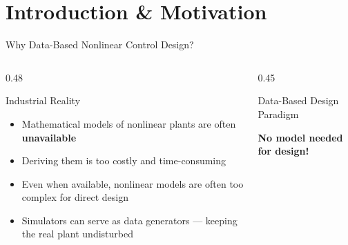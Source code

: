 \documentclass[hyperref={pdfpagemode=FullScreen},aspectratio=169]{beamer}
\newcommand{\highlight}[1]{{\color{accentgreen!70!black}\textbf{#1}}}
\newcommand{\alerttext}[1]{{\color{alertred}\textbf{#1}}}
\begin{document}
\section{Introduction \& Motivation}

\begin{frame}{Why Data-Based Nonlinear Control Design?}
  \begin{columns}[T]
    \begin{column}{0.48\textwidth}
      \begin{alertblock}{Industrial Reality}
        \begin{itemize}
          \item Mathematical models of nonlinear plants are often \alerttext{unavailable}
          \item Deriving them is too costly and time-consuming
          \item Even when available, nonlinear models are often too complex for direct design
          \item Simulators can serve as data generators --- keeping the real plant undisturbed
        \end{itemize}
      \end{alertblock}
    \end{column}
    \begin{column}{0.45\textwidth}
      \begin{block}{Data-Based Design Paradigm}
        \centering
      \end{block}
      \vspace{0.3em}
      \highlight{No model needed for design!}
    \end{column}
  \end{columns}
\end{frame}
\end{document}

